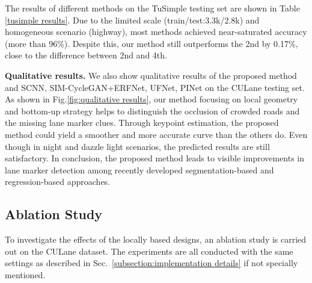 \documentclass[final]{cvpr}
\begin{document}
The results of different methods on the TuSimple testing set are shown in Table \ref{tusimple results}. Due to the limited scale (train/test:3.3k/2.8k) and homogeneous scenario (highway), most methods achieved near-saturated accuracy (more than 96\%). Despite this, our method still outperforms the 2nd by 0.17\%, close to the difference between 2nd and 4th. 



\textbf{Qualitative results.} We also show qualitative results of the proposed method and SCNN, SIM-CycleGAN+ERFNet, UFNet, PINet on the CULane testing set. As shown in Fig.\ref{fig:qualitative results}, our method focusing on local geometry and bottom-up strategy helps to distinguish the occlusion of crowded roads and the missing lane marker clues. Through keypoint estimation, the proposed method could yield a smoother and more accurate curve than the others do. Even though in night and dazzle light scenarios, the predicted results are still satisfactory. In conclusion, the proposed method leads to visible improvements in lane marker detection among recently developed segmentation-based and regression-based approaches.

\thispagestyle{empty}
\subsection{Ablation Study}
To investigate the effects of the locally based designs, an ablation study is carried out on the CULane dataset. The experiments are all conducted with the same settings as described in Sec.~\ref{subsection:implementation details} if not specially mentioned.
\end{document}
